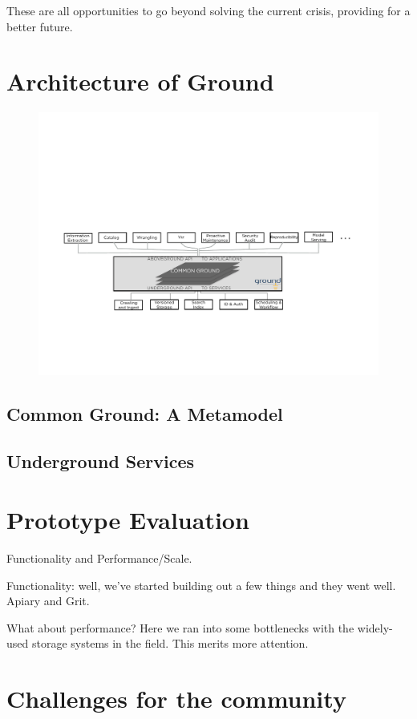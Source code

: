 \documentclass{sig-alternate}
\begin{document}
\vspace{1em}
These are all opportunities to go beyond solving the current crisis, providing for a better future.  

\section{Architecture of Ground}
\begin{figure}
\center
\includegraphics[width=0.7\linewidth]{groundarch.pdf}
\end{figure}

\subsection{Common Ground: A Metamodel}
\subsection{Underground Services}

\section{Prototype Evaluation}
Functionality and Performance/Scale.

Functionality: well, we've started building out a few things and they went well.  Apiary and Grit.

What about performance? Here we ran into some bottlenecks with the widely-used storage systems in the field.  This merits more attention.

\section{Challenges for the community}
\end{document}
